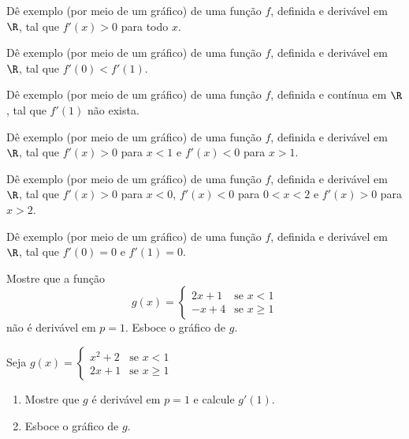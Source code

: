 \begin{exercicio}[8]
Dê exemplo (por meio de um gráfico) de uma função $f$, definida e derivável em $\R$, tal que $f'(x) > 0$ para todo $x$.
\end{exercicio}

\begin{exercicio}[9]
Dê exemplo (por meio de um gráfico) de uma função $f$, definida e derivável em $\R$, tal que $f'(0) < f'(1)$.
\end{exercicio}

\begin{exercicio}[10]
Dê exemplo (por meio de um gráfico) de uma função $f$, definida e contínua em $\R$, tal que $f'(1)$ não exista.
\end{exercicio}

\begin{exercicio}[11]
Dê exemplo (por meio de um gráfico) de uma função $f$, definida e derivável em $\R$, tal que $f'(x) > 0$ para $x < 1$ e $f'(x) < 0$ para $x > 1$.
\end{exercicio}

\begin{exercicio}[12]
Dê exemplo (por meio de um gráfico) de uma função $f$, definida e derivável em $\R$, tal que $f'(x) > 0$ para $x < 0$, $f'(x) < 0$ para $0 < x < 2$ e $f'(x) > 0$ para $x > 2$.
\end{exercicio}

\begin{exercicio}[13]
Dê exemplo (por meio de um gráfico) de uma função $f$, definida e derivável em $\R$, tal que $f'(0) = 0$ e $f'(1) = 0$.
\end{exercicio}

\begin{exercicio}[14]
Mostre que a função
\[
g(x) = \begin{cases} 
2x + 1 & \text{se } x < 1 \\ 
-x + 4 & \text{se } x \ge 1 
\end{cases}
\]
não é derivável em $p = 1$. Esboce o gráfico de $g$.
\end{exercicio}

\begin{exercicio}[15]
Seja $g(x) = \begin{cases} x^2 + 2 & \text{se } x < 1 \\ 2x + 1 & \text{se } x \ge 1 \end{cases}$
\begin{enumerate}[label=\alph*)]
    \item Mostre que $g$ é derivável em $p = 1$ e calcule $g'(1)$.
    \item Esboce o gráfico de $g$.
\end{enumerate}
\end{exercicio}

